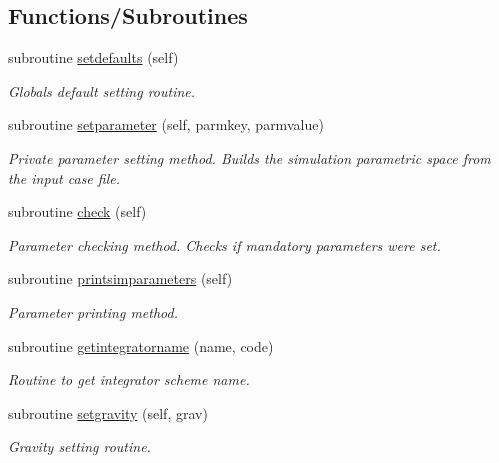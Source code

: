 \subsection*{Functions/\+Subroutines}
\begin{DoxyCompactItemize}
\item 
subroutine \mbox{\hyperlink{namespacesimulation__globals__mod_ac2ac06271de377004c67b6ba2f3ed353}{setdefaults}} (self)
\begin{DoxyCompactList}\small\item\em Globals default setting routine. \end{DoxyCompactList}\item 
subroutine \mbox{\hyperlink{namespacesimulation__globals__mod_a8a05831d4c3e3eb5741d65978f6fcf61}{setparameter}} (self, parmkey, parmvalue)
\begin{DoxyCompactList}\small\item\em Private parameter setting method. Builds the simulation parametric space from the input case file. \end{DoxyCompactList}\item 
subroutine \mbox{\hyperlink{namespacesimulation__globals__mod_a41249abb5c33ef9e8bff448f0b3826fa}{check}} (self)
\begin{DoxyCompactList}\small\item\em Parameter checking method. Checks if mandatory parameters were set. \end{DoxyCompactList}\item 
subroutine \mbox{\hyperlink{namespacesimulation__globals__mod_a97c04d0289a9f2d004a9329cb7ab16f0}{printsimparameters}} (self)
\begin{DoxyCompactList}\small\item\em Parameter printing method. \end{DoxyCompactList}\item 
subroutine \mbox{\hyperlink{namespacesimulation__globals__mod_a68e871ed8e5d3930884e968c6fdafddc}{getintegratorname}} (name, code)
\begin{DoxyCompactList}\small\item\em Routine to get integrator scheme name. \end{DoxyCompactList}\item 
subroutine \mbox{\hyperlink{namespacesimulation__globals__mod_a9e92dfed4ef7388208adce768f064554}{setgravity}} (self, grav)
\begin{DoxyCompactList}\small\item\em Gravity setting routine. \end{DoxyCompactList}\item 

\end{DoxyCompactItemize}
